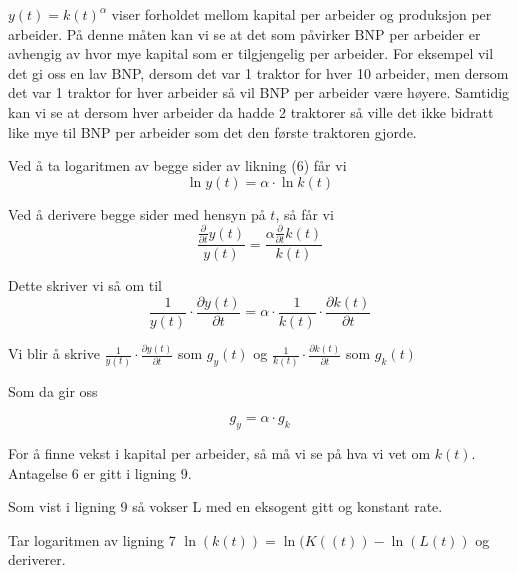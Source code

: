 \documentclass[
  12pt,
  a4paper,
  DIV=11,
  numbers=noendperiod]{scrartcl}
\begin{document}
\(y(t) = k(t)^\alpha\) viser forholdet mellom kapital per arbeider og
produksjon per arbeider. På denne måten kan vi se at det som påvirker
BNP per arbeider er avhengig av hvor mye kapital som er tilgjengelig per
arbeider. For eksempel vil det gi oss en lav BNP, dersom det var 1
traktor for hver 10 arbeider, men dersom det var 1 traktor for hver
arbeider så vil BNP per arbeider være høyere. Samtidig kan vi se at
dersom hver arbeider da hadde 2 traktorer så ville det ikke bidratt like
mye til BNP per arbeider som det den første traktoren gjorde.

Ved å ta logaritmen av begge sider av likning (6) får vi
\[ \ln y(t) = \alpha \cdot \ln k(t)\]

Ved å derivere begge sider med hensyn på \(t\), så får vi
\[ \frac{\frac{\partial}{\partial t} y{\left(t \right)}}{y{\left(t \right)}} = \frac{\alpha \frac{\partial}{\partial t} k{\left(t \right)}}{k{\left(t \right)}} \]

Dette skriver vi så om til
\[ \frac{1}{y(t)} \cdot \frac{\partial y(t)}{\partial t} = \alpha \cdot \frac{1}{k(t)} \cdot \frac{\partial k(t)}{\partial t}\]

Vi blir å skrive
\(\frac{1}{y(t)} \cdot \frac{\partial y(t)}{\partial t}\) som \(g_y(t)\)
og \(\frac{1}{k(t)} \cdot \frac{\partial k(t)}{\partial t}\) som
\(g_k(t)\)

Som da gir oss

\[g_y = \alpha \cdot g_k\]

For å finne vekst i kapital per arbeider, så må vi se på hva vi vet om
\(k(t)\). Antagelse 6 er gitt i ligning 9.


Som vist i ligning 9 så vokser L med en eksogent gitt og konstant rate.

Tar logaritmen av ligning 7 \(\ln(k(t)) = \ln(K((t)) - \ln(L(t))\) og
deriverer.
\end{document}
